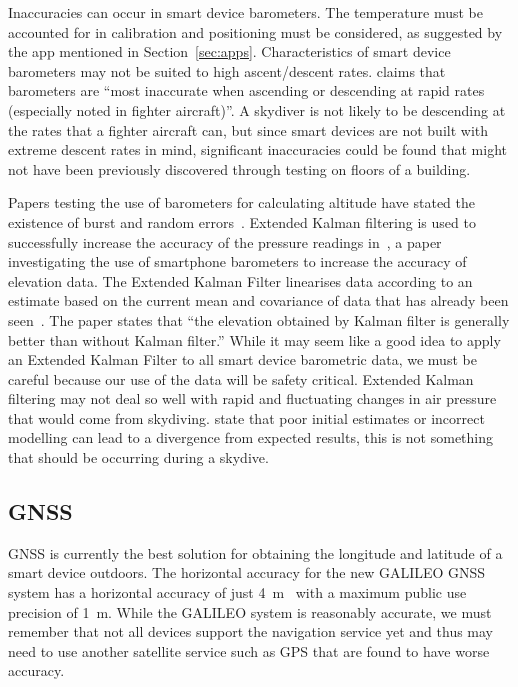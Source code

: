 \documentclass[11pt, twocolumn]{article}
\begin{document}
Inaccuracies can occur in smart device barometers. The temperature must be accounted for in calibration and positioning must be considered, as suggested by the  app mentioned in Section~\ref{sec:apps}. Characteristics of smart device barometers may not be suited to high ascent/descent rates. \textcite{gray_integrated_1995} claims that barometers are ``most inaccurate when ascending or descending at rapid rates (especially noted in fighter aircraft)''. A skydiver is not likely to be descending at the rates that a fighter aircraft can, but since smart devices are not built with extreme descent rates in mind, significant inaccuracies could be found that might not have been previously discovered through testing on floors of a building.

Papers testing the use of barometers for calculating altitude have stated the existence of burst and random errors~\cite{gray_integrated_1995, liu_beyond_2014}. Extended Kalman filtering is used to successfully increase the accuracy of the pressure readings in~\textcite{liu_beyond_2014}, a paper investigating the use of smartphone barometers to increase the accuracy of elevation data. The Extended Kalman Filter linearises data according to an estimate based on the current mean and covariance of data that has already been seen~\cite{julier_unscented_2004}. The paper states that ``the elevation obtained by Kalman filter is generally better than without Kalman filter.'' While it may seem like a good idea to apply an Extended Kalman Filter to all smart device barometric data, we must be careful because our use of the data will be safety critical. Extended Kalman filtering may not deal so well with rapid and fluctuating changes in air pressure that would come from skydiving. \textcite{huang_analysis_2008} state that poor initial estimates or incorrect modelling can lead to a divergence from expected results, this is not something that should be occurring during a skydive.

\subsection{GNSS}\label{sec:gps} %

GNSS is currently the best solution for obtaining the longitude and latitude of a smart device outdoors. The horizontal accuracy for the new GALILEO GNSS system has a horizontal accuracy of just \SI{4}{\metre}~\cite{kaplan_understanding_2005} with a maximum public use precision of \SI{1}{\metre}. While the GALILEO system is reasonably accurate, we must remember that not all devices support the navigation service yet and thus may need to use another satellite service such as GPS that are found to have worse accuracy.
\end{document}
